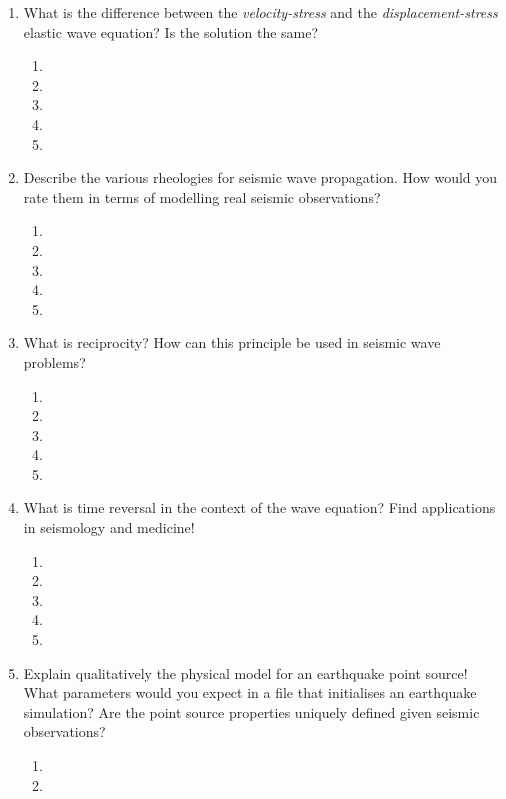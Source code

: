 \begin{enumerate}
\begin{enumerate}
\item[] 
\end{enumerate}
\item
What is the difference between the {\it velocity-stress} and the {\it displacement-stress} elastic wave equation? Is the solution the same?
\begin{enumerate}
\item[]
\item[]
\item[] 
\item[]
\item[] 
\end{enumerate}
\item
Describe the various rheologies for seismic wave propagation. How would you rate them in terms of  modelling real seismic observations?
\begin{enumerate}
\item[]
\item[]
\item[] 
\item[]
\item[] 
\end{enumerate}
\item
What is reciprocity? How can this principle be used in seismic wave problems?
\begin{enumerate}
\item[]
\item[]
\item[] 
\item[]
\item[] 
\end{enumerate}
\item
What is time reversal in the context of the wave equation? Find applications in seismology and medicine!
\begin{enumerate}
\item[]
\item[]
\item[] 
\item[]
\item[] 
\end{enumerate}
\item
Explain qualitatively the physical  model for an earthquake point source! What parameters would you expect in a file that initialises an earthquake simulation? Are the point source properties uniquely defined given seismic observations?
\begin{enumerate}
\item[]
\item[]

\end{enumerate}
\end{enumerate}
